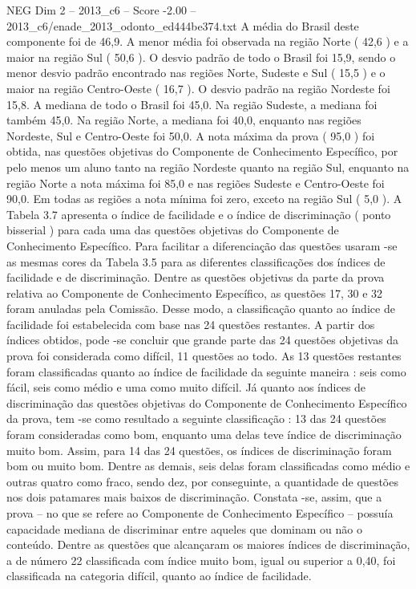 \begin{textsample}{NEG Dim 2 – 2013\_c6 – Score -2.00 – 2013\_c6/enade\_2013\_odonto\_ed444be374.txt}
A média do Brasil deste componente foi de 46,9.
A menor média foi observada na região Norte ( 42,6 ) e a maior na região Sul ( 50,6 ).
O desvio padrão de todo o Brasil foi 15,9, sendo o menor desvio padrão encontrado nas regiões Norte, Sudeste e Sul ( 15,5 ) e o maior na região Centro-Oeste ( 16,7 ).
O desvio padrão na região Nordeste foi 15,8.
A mediana de todo o Brasil foi 45,0.
Na região Sudeste, a mediana foi também 45,0.
Na região Norte, a mediana foi 40,0, enquanto nas regiões Nordeste, Sul e Centro-Oeste foi 50,0.
A nota máxima da prova ( 95,0 ) foi obtida, nas questões objetivas do Componente de Conhecimento Específico, por pelo menos um aluno tanto na região Nordeste quanto na região Sul, enquanto na região Norte a nota máxima foi 85,0 e nas regiões Sudeste e Centro-Oeste foi 90,0.
Em todas as regiões a nota mínima foi zero, exceto na região Sul ( 5,0 ).
A Tabela 3.7 apresenta o índice de facilidade e o índice de discriminação ( ponto bisserial ) para cada uma das questões objetivas do Componente de Conhecimento Específico.
Para facilitar a diferenciação das questões usaram -se as mesmas cores da Tabela 3.5 para as diferentes classificações dos índices de facilidade e de discriminação.
Dentre as questões objetivas da parte da prova relativa ao Componente de Conhecimento Específico, as questões 17, 30 e 32 foram anuladas pela Comissão.
Desse modo, a classificação quanto ao índice de facilidade foi estabelecida com base nas 24 questões restantes.
A partir dos índices obtidos, pode -se concluir que grande parte das 24 questões objetivas da prova foi considerada como difícil, 11 questões ao todo.
As 13 questões restantes foram classificadas quanto ao índice de facilidade da seguinte maneira : seis como fácil, seis como médio e uma como muito difícil.
Já quanto aos índices de discriminação das questões objetivas do Componente de Conhecimento Específico da prova, tem -se como resultado a seguinte classificação : 13 das 24 questões foram consideradas como bom, enquanto uma delas teve índice de discriminação muito bom.
Assim, para 14 das 24 questões, os índices de discriminação foram bom ou muito bom.
Dentre as demais, seis delas foram classificadas como médio e outras quatro como fraco, sendo dez, por conseguinte, a quantidade de questões nos dois patamares mais baixos de discriminação.
Constata -se, assim, que a prova – no que se refere ao Componente de Conhecimento Específico – possuía capacidade mediana de discriminar entre aqueles que dominam ou não o conteúdo.
Dentre as questões que alcançaram os maiores índices de discriminação, a de número 22 classificada com índice muito bom, igual ou superior a 0,40, foi classificada na categoria difícil, quanto ao índice de facilidade.

\end{textsample}
